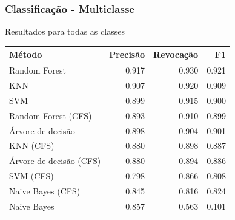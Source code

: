 \documentclass[t]{beamer}
\begin{document}
\begin{frame}[c]
	\frametitle{Classificação - Multiclasse}

	\centering
	Resultados para todas as classes

	\small{
	\begin{table}[h]
		\centering
		\begin{tabulary}{\linewidth}{|L|R|R|R|}
			\hline
			\textbf{Método} & \textbf{Precisão} & \textbf{Revocação} & \textbf{F1} \\ \hline
			Random Forest          & 0.917 & 0.930 & 0.921 \\ \hline
			KNN                     & 0.907 & 0.920 & 0.909 \\ \hline
			SVM                     & 0.899 & 0.915 & 0.900 \\ \hline
			Random Forest (CFS)     & 0.893 & 0.910 & 0.899 \\ \hline
			Árvore de decisão             & 0.898 & 0.904 & 0.901 \\ \hline
			KNN (CFS)               & 0.880 & 0.898 & 0.887 \\ \hline
			Árvore de decisão (CFS) & 0.880 & 0.894 & 0.886 \\ \hline
			SVM (CFS)               & 0.798 & 0.866 & 0.808 \\ \hline
			Naive Bayes (CFS)       & 0.845 & 0.816 & 0.824 \\ \hline
			Naive Bayes             & 0.857 & 0.563 & 0.101 \\ \hline
		\end{tabulary}
	\end{table}
	}
\end{frame}
\end{document}
